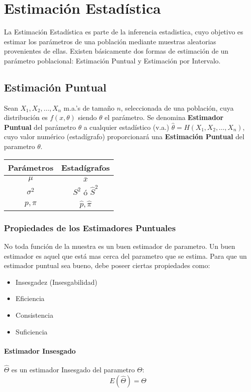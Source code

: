 \chapter{Estimación Estadística}
La Estimación Estadística es parte de la inferencia estadistica, cuyo objetivo es estimar los parámetros de una población mediante muestras aleatorias provenientes de ellas. Existen básicamente dos formas de estimación de un parámetro poblacional: Estimación Puntual y Estimación por Intervalo.
\section{Estimación Puntual}
Sean $X_1,X_2,\ldots,X_n$ m.a.'s de tamaño $n$, seleccionada de una población, cuya distribución es $f(x,\theta)$ siendo $\theta$ el parámetro. Se denomina \textbf{Estimador Puntual} del parámetro $\theta$ a cualquier estadístico (v.a.) $\widehat{\theta}=H(X_1,X_2,\ldots,X_n)$, cuyo valor numérico (estadígrafo) proporcionará una \textbf{Estimación Puntual} del parametro $\theta$.
\begin{center}
 \begin{tabular}{|c|c|}
\hline 
Parámetros & Estadígrafos \\ 
\hline 
$\mu$ & $\bar{x}$ \\ 
$\sigma^2$ & $S^2$ ó $\hat{S}^2$ \\
$p,\pi$ & $\hat{p},\hat{\pi}$\\
\hline 
\end{tabular}
 \end{center} 
\subsection{Propiedades de los Estimadores Puntuales}
No toda función de la muestra es un buen estimador de parametro. Un buen estimador es aquel que está mas cerca del parametro que se estima. Para que un estimador puntual sea bueno, debe poseer ciertas propiedades como:
\begin{itemize}
\item Insesgadez (Insesgabilidad)
\item Eficiencia
\item Consistencia
\item Suficiencia
\end{itemize}
\subsubsection{Estimador Insesgado}
$\widehat{\Theta}$ es un estimador Insesgado del parametro $\Theta$:
$$E(\widehat{\Theta})=\Theta$$
